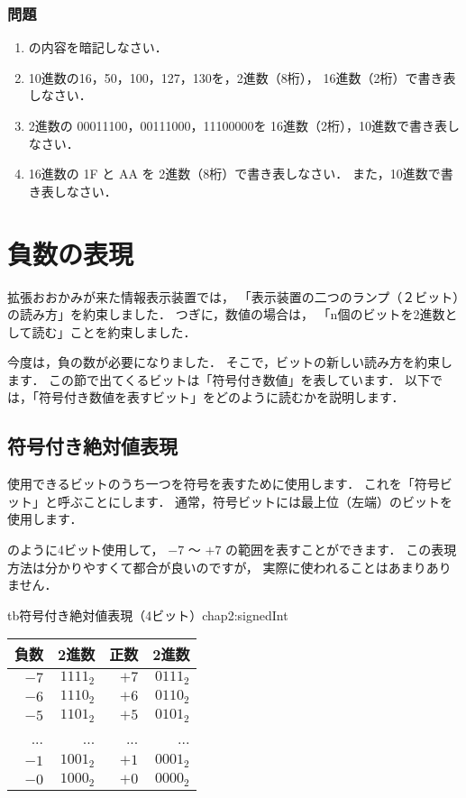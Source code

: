 \begin{flushleft}
\subsubsection{問題}
\begin{enumerate}
\item
の内容を暗記しなさい．
\item
10進数の16，50，100，127，130を，2進数（8桁），
16進数（2桁）で書き表しなさい．
\item
2進数の 00011100，00111000，11100000を
16進数（2桁），10進数で書き表しなさい．
\item
16進数の 1F と AA を
2進数（8桁）で書き表しなさい．
また，10進数で書き表しなさい．
\end{enumerate}
\end{flushleft}

\newpage
\section{負数の表現}
\label{minus}
拡張おおかみが来た情報表示装置では，
「表示装置の二つのランプ（２ビット）の読み方」を約束しました．
つぎに，数値の場合は，
「n個のビットを2進数として読む」ことを約束しました．

今度は，負の数が必要になりました．
そこで，ビットの新しい読み方を約束します．
この節で出てくるビットは「符号付き数値」を表しています．
以下では，「符号付き数値を表すビット」をどのように読むかを説明します．

\subsection{符号付き絶対値表現}
使用できるビットのうち一つを符号を表すために使用します．
これを「符号ビット」と呼ぶことにします．
通常，符号ビットには最上位（左端）のビットを使用します．

のように4ビット使用して，
$-7$ 〜 $+7$ の範囲を表すことができます．
この表現方法は分かりやすくて都合が良いのですが，
実際に使われることはあまりありません．

\begin{mytable}{tb}{符号付き絶対値表現（4ビット）}{chap2:signedInt}
{\small\begin{tabular}{ r | r || r | r }
\hline
\hline
負数 & 2進数    & 正数 & 2進数 \\
\hline
$-7$ & $1111_2$ & $+7$ & $0111_2$ \\
$-6$ & $1110_2$ & $+6$ & $0110_2$ \\
$-5$ & $1101_2$ & $+5$ & $0101_2$ \\
...  & ...      & ...  & ... \\
$-1$ & $1001_2$ & $+1$ & $0001_2$ \\
$-0$ & $1000_2$ & $+0$ & $0000_2$ \\
\end{tabular}}
\end{mytable}

